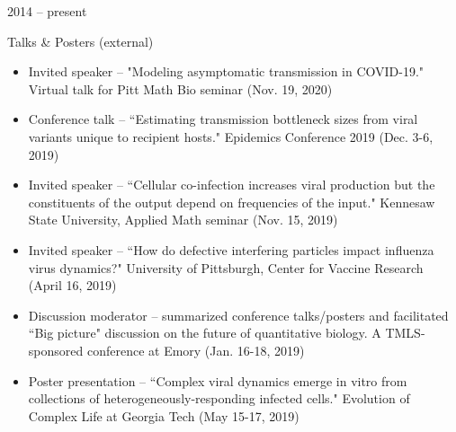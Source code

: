 \documentclass[a4paper,10pt]{article}
\newlength{\cvcolumngapwidth}
\newlength{\cvleftcolumnwidth}
\newlength{\cvrightcolumnwidth}
\newcommand{\cvtitlestyle}[1]{{\large\cvtitlefont\textcolor{cvtitlecolor}{#1}}}
\newcommand{\cvheadingstyle}[1]{{\normalsize\cvheadingfont\textcolor{cvheadingcolor}{#1}}}
\newlength{\cvafteritemskipamount}
\newlength{\cvaftertitleskipamount}
\newlength{\cvparskip}
\newcommand{\cvitem}[2]{
    \begin{minipage}[t]{\cvleftcolumnwidth}
        \raggedleft #1
    \end{minipage}%
    \hspace{\cvcolumngapwidth}%
    \begin{minipage}[t]{\cvrightcolumnwidth}
        \setlength{\parskip}{\cvparskip} #2
    \end{minipage}

    \vspace{\cvafteritemskipamount}
}
\newcommand{\cvtitle}[1]{
    \cvtitlestyle{#1}

    \vspace{\cvaftertitleskipamount}
    \vspace{-\cvparskip}
}
\begin{document}
\cvitem{
    \cvheadingstyle{2014 -- present}
}{

    \cvtitle{Talks \& Posters (external)}
    \begin{itemize}[leftmargin=*]
    	\item Invited speaker -- "Modeling asymptomatic transmission in COVID-19." Virtual talk for Pitt Math Bio seminar (Nov. 19, 2020) \\
    	\item Conference talk -- ``Estimating transmission bottleneck sizes from viral variants unique to recipient hosts." Epidemics Conference 2019 (Dec. 3-6, 2019) \\
        \item Invited speaker -- ``Cellular co-infection increases viral production but the constituents of the output depend on frequencies of the input." Kennesaw State University, Applied 	Math seminar (Nov. 15, 2019) \\
       	\item Invited speaker -- ``How do defective interfering particles impact influenza virus dynamics?" University of Pittsburgh, Center for Vaccine Research (April 16, 2019) \\
        \item Discussion moderator -- summarized conference talks/posters and facilitated ``Big picture" discussion on the future of quantitative biology. A TMLS-sponsored conference at Emory (Jan. 16-18, 2019) \\

        \item Poster presentation -- ``Complex viral dynamics emerge in vitro from collections of heterogeneously-responding infected cells." Evolution of Complex Life at Georgia Tech (May 15-17, 2019) \\
    \end{itemize}
    
}
\end{document}
